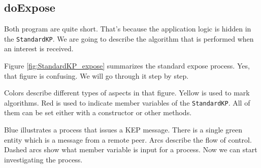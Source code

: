 \subsection{doExpose}
Both program are quite short. That's because the application logic is hidden in the {\tt StandardKP}. We are going to describe the algorithm that is performed when an interest is received.

Figure \ref{fig:StandardKP_expose} summarizes the standard expose process.
Yes, that figure is confusing. We will go through it step by step.

Colors describe different types of aspects in that figure. Yellow is used to mark algorithms. Red is used to indicate member variables of the {\tt StandardKP}. All of them can be set either with a constructor or other methods.

Blue illustrates a process that issues a KEP message. There is a single green entity which is a message from a remote peer. Arcs describe the flow of control. Dashed arcs show what member variable is input for a process. Now we can start investigating the process.

